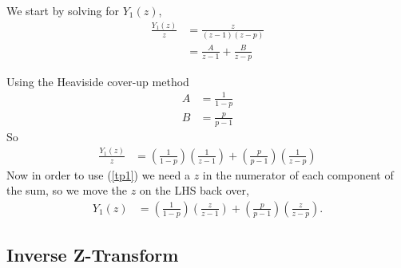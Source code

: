 \documentclass[letterpaper]{article}
\begin{document}
We start by solving for $Y_1(z)$,
\begin{align}
	\frac{Y_1(z)}{z} &= \frac{z}{(z-1)(z - p)} \\
					 &= \frac{A}{z-1} + \frac{B}{z-p}
\end{align}

Using the Heaviside cover-up method
\begin{align}
	A &= \frac{1}{1 - p} \\
	B &= \frac{p}{p - 1}
\end{align}
So
\begin{align}
	\frac{Y_1(z)}{z} &= \left(\frac{1}{1 - p}\right)\left(\frac{1}{z-1}\right) 
						+ \left(\frac{p}{p - 1}\right)\left(\frac{1}{z-p}\right) 
\end{align}
Now in order to use (\ref{tp1}) we need a $z$ in the numerator of each component of the sum, so we move the $z$ on the LHS back over,
\begin{align}
	Y_1(z) &= \left(\frac{1}{1 - p}\right)\left(\frac{z}{z-1}\right) 
	+ \left(\frac{p}{p - 1}\right)\left(\frac{z}{z-p}\right).
\end{align}

\pagebreak
\subsection{Inverse Z-Transform}
\end{document}
